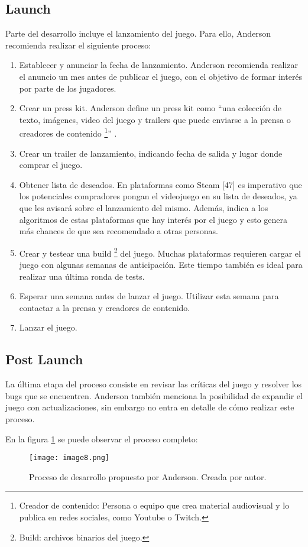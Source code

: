 \subsection{Launch}
Parte del desarrollo incluye el lanzamiento del juego. Para ello, Anderson recomienda realizar el siguiente proceso:
\begin{enumerate}
  \item Establecer y anunciar la fecha de lanzamiento. Anderson recomienda realizar el anuncio un mes antes de publicar el juego, con el objetivo de formar interés por parte de los jugadores.
  \item Crear un press kit. Anderson define un press kit como “una colección de texto, imágenes, video del juego y trailers que puede enviarse a la prensa o creadores de contenido \footnote{Creador de contenido: Persona o equipo que crea material audiovisual y lo publica en redes sociales, como Youtube o Twitch.}” \cite{andersonProductionPointHow2023}.
  \item Crear un trailer de lanzamiento, indicando fecha de salida y lugar donde comprar el juego.
  \item Obtener lista de deseados. En plataformas como Steam [47] es imperativo que los potenciales compradores pongan el videojuego en su lista de deseados, ya que les avisará sobre el lanzamiento del mismo. Además, indica a los algoritmos de estas plataformas que hay interés por el juego y esto genera más chances de que sea recomendado a otras personas.
  \item Crear y testear una build \footnote{Build: archivos binarios del juego.} del juego. Muchas plataformas requieren cargar el juego con algunas semanas de anticipación. Este tiempo también es ideal para realizar una última ronda de tests.
  \item Esperar una semana antes de lanzar el juego. Utilizar esta semana para contactar a la prensa y creadores de contenido.
  \item Lanzar el juego.
\end{enumerate}
%
%
\subsection{Post Launch}
\par La última etapa del proceso consiste en revisar las críticas del juego y resolver los bugs que se encuentren. Anderson también menciona la posibilidad de expandir el juego con actualizaciones, sin embargo no entra en detalle de cómo realizar este proceso.
\bigbreak
\par En la figura \ref{fig:x proceso de desarrollo Anderson} se puede observar el proceso completo:
\begin{figure}[H]
  \centering
  \texttt{[image: image8.png]}
  \caption{Proceso de desarrollo propuesto por Anderson. Creada por autor.}
  \label{fig:x proceso de desarrollo Anderson}
\end{figure}
